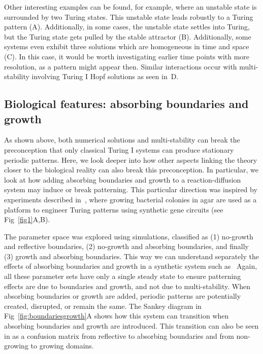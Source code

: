 \documentclass[10pt,letterpaper]{article}
\begin{document}
Other interesting examples can be found, for example, where an unstable state is surrounded by two Turing states. This unstable state leads robustly to a Turing pattern (A).
Additionally, in some cases, the unstable state settles into Turing, but the Turing state gets pulled by the stable attractor (B). Additionally, some systems even exhibit three solutions which are homogeneous in time and space (C). In this case, it would be worth investigating earlier time points with more resolution, as a pattern might appear then.
Similar interactions occur with multi-stability involving Turing I Hopf solutions as seen in~D.




\subsection*{Biological features: absorbing boundaries and growth}
As shown above, both numerical solutions and multi-stability can break the preconception that only classical Turing I systems can produce stationary periodic patterns.
Here, we look deeper into how other aspects linking the theory closer to the biological reality can also break this preconception.
In particular, we look at how adding absorbing boundaries and growth to a reaction-diffusion system may induce or break patterning.
This particular direction was inspired by experiments described in~\cite{Oliver2023}, where growing bacterial colonies in agar are used as a platform to engineer Turing patterns using synthetic gene circuits (see Fig~\ref{fig1}A,B).

The parameter space was explored using simulations, classified as  (1) no-growth and reflective boundaries, (2) no-growth and absorbing boundaries, and finally (3) growth and absorbing boundaries. This way we can understand separately the effects of absorbing boundaries and growth in a synthetic system such as~\cite{Oliver2023}
Again, all these parameter sets have only a single steady state to ensure patterning effects are due to boundaries and growth, and not due to multi-stability.
When absorbing boundaries or growth are added, periodic patterns are potentially created, disrupted, or remain the same.
The Sankey diagram in Fig~\ref{fig:boundariesgrowth}A shows how this system can transition when absorbing boundaries and growth are introduced.
This transition can also be seen in  as a confusion matrix from reflective to absorbing boundaries and from non-growing to growing domains.
\end{document}
